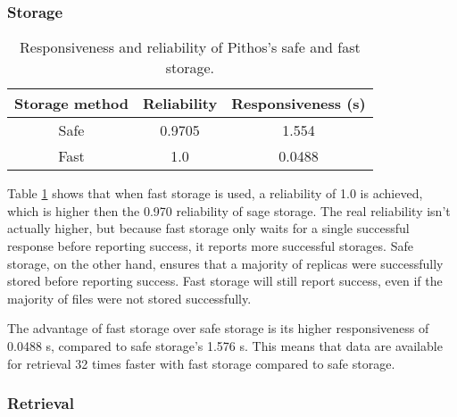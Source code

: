 \subsubsection{Storage}
\begin{table}[htbp]
\centering
\begin{tabular}{|c|c|c|}
\hline
Storage method & Reliability & Responsiveness (s)\\
\hline
Safe    &  0.9705  &   1.554  \\
Fast    &  1.0     &   0.0488 \\
\hline
\end{tabular}
\caption{Responsiveness and reliability of Pithos's safe and fast storage.}
\label{tab_pithos_storage_results}
\end{table}
%
Table \ref{tab_pithos_storage_results} shows that when fast storage is used, a reliability of 1.0 is achieved, which is higher then the 0.970 reliability of sage storage. The real reliability isn't actually higher, but because fast storage only waits for a single successful response before reporting success, it reports more successful storages. Safe storage, on the other hand, ensures that a majority of replicas were successfully stored before reporting success. Fast storage will still report success, even if the majority of files were not stored successfully.

The advantage of fast storage over safe storage is its higher responsiveness of 0.0488 s, compared to safe storage's 1.576 s. This means that data are available for retrieval 32 times faster with fast storage compared to safe storage.

\subsubsection{Retrieval}

